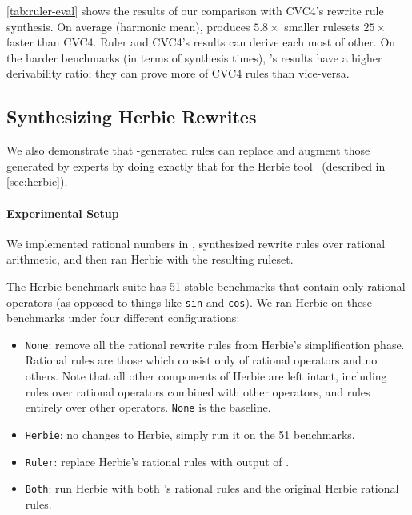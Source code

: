 \autoref{tab:ruler-eval} shows the results of our comparison with CVC4's
 rewrite rule synthesis.
On average (harmonic mean),
  produces $5.8\times$ smaller
 rulesets $25\times$ faster than CVC4.
Ruler and CVC4's results can derive each most of other.
On the harder benchmarks (in terms of synthesis times),
 's results have a higher derivability ratio;
 they can prove more of CVC4 rules than vice-versa.


\subsection{Synthesizing Herbie Rewrites}
\label{sec:ruler-herbie}

We also demonstrate that -generated rules
 can replace and augment those generated by experts
 by doing exactly that for the Herbie tool~\cite{herbie}
 (described in \autoref{sec:herbie}).

\paragraph{Experimental Setup}

We implemented rational numbers in ,
  synthesized rewrite rules
  over rational arithmetic,
  and then ran Herbie
  with the resulting ruleset.

The Herbie benchmark suite has 51 stable benchmarks
 that contain only rational operators
 (as opposed to things like \texttt{sin} and \texttt{cos}).
We ran Herbie on these benchmarks under four different configurations:
\begin{itemize}
\item \lstinline{None}: remove all the
  rational rewrite rules from Herbie's simplification phase.
Rational rules are those which consist only of rational operators
  and no others.
Note that all other components of Herbie are left intact,
  including rules over
  rational operators combined with other operators,
  and rules entirely over
  other operators.
\lstinline{None} is the baseline.
\item \lstinline{Herbie}: no changes to Herbie, simply run it on the 51 benchmarks.
\item \lstinline{Ruler}: replace Herbie's rational rules with output of .
\item \lstinline{Both}: run Herbie with both 's rational rules and the
  original Herbie rational rules.
  \end{itemize}


